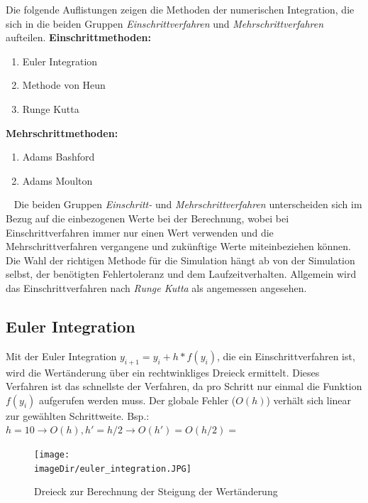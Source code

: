 \documentclass[11pt, a4paper, twoside]{article}   	%
\newcommand{\imageDir}{./images/}
\begin{document}
\newline
\newline
Die folgende Auflistungen zeigen die Methoden der numerischen Integration, die sich in die beiden Gruppen \emph{Einschrittverfahren} und \emph{Mehrschrittverfahren} aufteilen.
\newline
\newline
\textbf{Einschrittmethoden:}
\begin{enumerate}
	\item Euler Integration
	\item Methode von Heun
	\item Runge Kutta
\end{enumerate}
\textbf{Mehrschrittmethoden:}
\begin{enumerate}
	\item Adams Bashford
	\item Adams Moulton
\end{enumerate}
\ \newline
Die beiden Gruppen \emph{Einschritt-} und \emph{Mehrschrittverfahren} unterscheiden sich im Bezug auf die einbezogenen Werte bei der Berechnung, wobei bei Einschrittverfahren immer nur einen Wert verwenden und die Mehrschrittverfahren vergangene und zukünftige Werte miteinbeziehen können. Die Wahl der richtigen Methode für die Simulation hängt ab von der Simulation selbst, der benötigten Fehlertoleranz und dem Laufzeitverhalten. Allgemein wird das Einschrittverfahren nach \emph{Runge Kutta} als angemessen angesehen.
\newpage 

\subsection{Euler Integration}
Mit der Euler Integration $y_{i+1}=y_i+h*f(y_i)$, die ein Einschrittverfahren ist, wird die Wertänderung über ein rechtwinkliges Dreieck ermittelt. Dieses Verfahren ist das schnellste der Verfahren, da pro Schritt nur einmal die Funktion $f(y_i)$ aufgerufen werden muss. Der globale Fehler ($O(h)$) verhält sich linear zur gewählten Schrittweite.
\newline
\newline
Bsp.: $h=10 \rightarrow O(h), h'=h/2 \rightarrow O(h')=O(h/2)=$

\begin{figure}[h]
\centering
\texttt{[image: \\imageDir/euler\_integration.JPG]}
\caption{Dreieck zur Berechnung der Steigung der Wertänderung}
\label{fig:euler-integration}
\end{figure}
\end{document}
